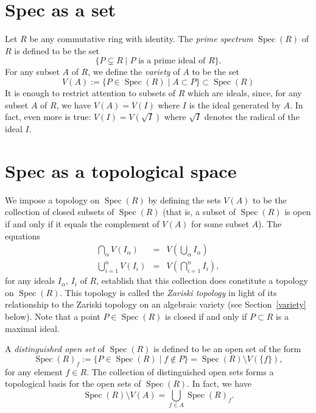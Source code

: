 \documentclass[12pt]{article}
\newcommand{\st}{\mid}
\newcommand{\Spec}{\operatorname{Spec}}
\begin{document}
\section{Spec as a set}

Let $R$ be any commutative ring with identity. The {\em prime
spectrum} $\Spec(R)$ of $R$ is defined to be the set
$$
\{ P \subsetneq R \st P \text{ is a prime ideal of } R\}.
$$
For any subset $A$ of $R$, we define the {\em variety} of $A$ to be
the set
$$
V(A) := \{ P \in \Spec(R) \st A \subset P \} \subset \Spec(R)
$$
It is enough to restrict attention to subsets of $R$ which are ideals,
since, for any subset $A$ of $R$, we have $V(A) = V(I)$ where $I$ is
the ideal generated by $A$. In fact, even more is true: $V(I) =
V(\sqrt{I})$ where $\sqrt{I}$ denotes the radical of the ideal $I$.

\section{Spec as a topological space}

We impose a topology on $\Spec(R)$ by defining the sets $V(A)$ to be
the collection of closed subsets of $\Spec(R)$ (that is, a subset of
$\Spec(R)$ is open if and only if it equals the complement of $V(A)$
for some subset $A$). The equations
\begin{eqnarray*}
\bigcap_{\alpha} V(I_\alpha) & = & V\left(\bigcup_{\alpha} I_\alpha
\right) \\
\bigcup_{i=1}^n V(I_i) & = & V\left(\bigcap_{i=1}^n I_i\right),
\end{eqnarray*}
for any ideals $I_\alpha$, $I_i$ of $R$, establish that this collection does constitute a topology on
$\Spec(R)$. This topology is called the {\em Zariski topology} in
light of its relationship to the Zariski topology on an algebraic
variety (see Section~\ref{variety} below). Note that a point $P \in
\Spec(R)$ is closed if and only if $P \subset R$ is a maximal ideal.

A {\em distinguished open set} of $\Spec(R)$ is defined to be an open
set of the form
$$
\Spec(R)_f := \{ P \in \Spec(R) \st f \notin P \} = \Spec(R) \setminus
V(\{f\}),
$$
for any element $f \in R$. The collection of distinguished open sets
forms a topological basis for the open sets of $\Spec(R)$. In fact, we
have
$$
\Spec(R) \setminus V(A) = \bigcup_{f \in A} \Spec(R)_f.
$$
\end{document}
